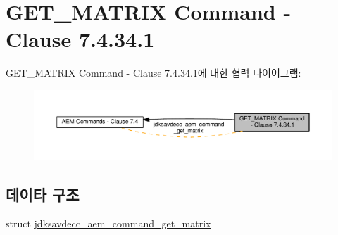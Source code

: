 \hypertarget{group__command__get__matrix}{}\section{G\+E\+T\+\_\+\+M\+A\+T\+R\+IX Command -\/ Clause 7.4.34.1}
\label{group__command__get__matrix}
G\+E\+T\+\_\+\+M\+A\+T\+R\+IX Command -\/ Clause 7.4.34.1에 대한 협력 다이어그램\+:
\nopagebreak
\begin{figure}[H]
\begin{center}
\leavevmode
\includegraphics[width=350pt]{group__command__get__matrix}
\end{center}
\end{figure}
\subsection*{데이타 구조}
\begin{DoxyCompactItemize}
\item 
struct \hyperlink{structjdksavdecc__aem__command__get__matrix}{jdksavdecc\+\_\+aem\+\_\+command\+\_\+get\+\_\+matrix}
\end{DoxyCompactItemize}
